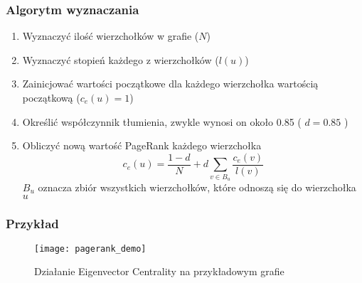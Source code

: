 \subsubsection{Algorytm wyznaczania}
\begin{enumerate}
\item Wyznaczyć ilość wierzchołków w grafie ($N$)
\item Wyznaczyć stopień każdego z wierzchołków ($l(u)$)
\item Zainicjować wartości początkowe dla każdego wierzchołka wartością początkową ($c_e(u) = 1$)
\item Określić współczynnik tłumienia, zwykle wynosi on około 0.85 ( $d = 0.85$ )
\item Obliczyć nową wartość PageRank każdego wierzchołka $$ c_e(u) = \frac{1 - d}{N} + d\sum_{v \in B_u} \frac{c_e(v)}{l(v)}$$ $B_u$ oznacza zbiór wszystkich wierzchołków, które odnoszą się do wierzchołka $u$
\end{enumerate}

\newpage
\FloatBarrier
\subsubsection{Przykład}
\begin{figure}[h]
\centering
\texttt{[image: pagerank\_demo]}
\caption{Działanie Eigenvector Centrality  na przykładowym grafie}
\end{figure}
\FloatBarrier